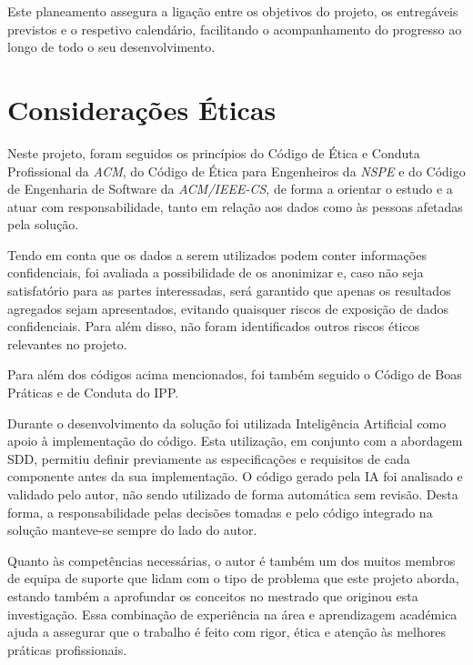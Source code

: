 	Este planeamento assegura a ligação entre os objetivos do projeto, os entregáveis previstos e o respetivo calendário, facilitando o acompanhamento do progresso ao longo de todo o seu desenvolvimento.

\section{Considerações Éticas}
	Neste projeto, foram seguidos os princípios do Código de Ética e Conduta Profissional da \textit{\gls{ACM}}, do Código de Ética para Engenheiros da \textit{\gls{NSPE}} e do Código de Engenharia de Software da \textit{ACM/IEEE-CS}, de forma a orientar o estudo e a atuar com responsabilidade, tanto em relação aos dados como às pessoas afetadas pela solução.

	Tendo em conta que os dados a serem utilizados podem conter informações confidenciais, foi avaliada a possibilidade de os anonimizar e, caso não seja satisfatório para as partes interessadas, será garantido que apenas os resultados agregados sejam apresentados, evitando quaisquer riscos de exposição de dados confidenciais. Para além disso, não foram identificados outros riscos éticos relevantes no projeto.
	
	Para além dos códigos acima mencionados, foi também seguido o Código de Boas Práticas e de Conduta do \gls{IPP}.
	
	Durante o desenvolvimento da solução foi utilizada Inteligência Artificial como apoio à implementação do código. Esta utilização, em conjunto com a abordagem \gls{SDD}, permitiu definir previamente as especificações e requisitos de cada componente antes da sua implementação. O código gerado pela IA foi analisado e validado pelo autor, não sendo utilizado de forma automática sem revisão. Desta forma, a responsabilidade pelas decisões tomadas e pelo código integrado na solução manteve-se sempre do lado do autor.
	
	Quanto às competências necessárias, o autor é também um dos muitos membros de equipa de suporte que lidam com o tipo de problema que este projeto aborda, estando também a aprofundar os conceitos no mestrado que originou esta investigação. Essa combinação de experiência na área e aprendizagem académica ajuda a assegurar que o trabalho é feito com rigor, ética e atenção às melhores práticas profissionais.

